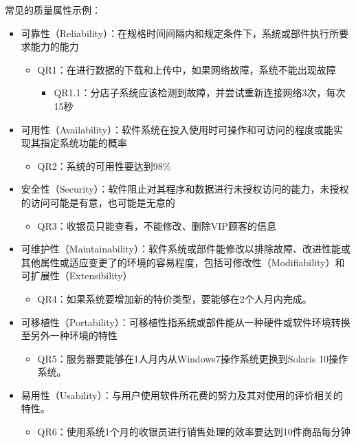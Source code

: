 常见的质量属性示例：
\begin{itemize}
    \item 可靠性（Reliability）：在规格时间间隔内和规定条件下，系统或部件执行所要求能力的能力
    \begin{itemize}
        \item QR1：在进行数据的下载和上传中，如果网络故障，系统不能出现故障
        \begin{itemize}
            \item QR1.1：分店子系统应该检测到故障，并尝试重新连接网络3次，每次15秒
        \end{itemize}
    \end{itemize}
    \item 可用性（Availability）：软件系统在投入使用时可操作和可访问的程度或能实现其指定系统功能的概率
    \begin{itemize}
        \item QR2：系统的可用性要达到98\%
    \end{itemize}
    \item 安全性（Security）：软件阻止对其程序和数据进行未授权访问的能力，未授权的访问可能是有意，也可能是无意的
    \begin{itemize}
        \item QR3：收银员只能查看，不能修改、删除VIP顾客的信息
    \end{itemize}
    \item 可维护性（Maintainability）：软件系统或部件能修改以排除故障、改进性能或其他属性或适应变更了的环境的容易程度，包括可修改性（Modifiability）和可扩展性（Extensibility）
    \begin{itemize}
        \item QR4：如果系统要增加新的特价类型，要能够在2个人月内完成。
    \end{itemize}
    \item 可移植性（Portability）：可移植性指系统或部件能从一种硬件或软件环境转换至另外一种环境的特性
    \begin{itemize}
        \item QR5：服务器要能够在1人月内从Windows7操作系统更换到Solaris 10操作系统。
    \end{itemize}
    \item 易用性（Usability）：与用户使用软件所花费的努力及其对使用的评价相关的特性。
    \begin{itemize}
        \item QR6：使用系统1个月的收银员进行销售处理的效率要达到10件商品每分钟
    \end{itemize}
\end{itemize}


